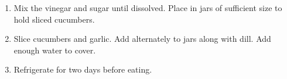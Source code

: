 
\begin{ingredients}
\end{ingredients}


\begin{recipe}
  \begin{enumerate}

  \item Mix the vinegar and sugar until dissolved.  Place in jars of
    sufficient size to hold sliced cucumbers.

  \item Slice cucumbers and garlic.  Add alternately to jars along
    with dill.  Add enough water to cover.

  \item Refrigerate for two days before eating.

  \end{enumerate}
\end{recipe}
